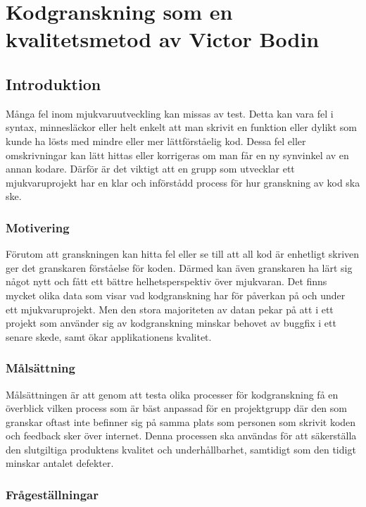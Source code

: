 \chapter{Kodgranskning som en kvalitetsmetod av Victor Bodin}
\section{Introduktion}
\label{sec:victor-introduction}
Många fel inom mjukvaruutveckling kan missas av test. Detta kan vara fel i syntax, minnesläckor eller helt enkelt att man skrivit en funktion eller dylikt som kunde ha lösts med mindre eller mer lättförståelig kod. Dessa fel eller omskrivningar kan lätt hittas eller korrigeras om man får en ny synvinkel av en annan kodare. Därför är det viktigt att en grupp som utvecklar ett mjukvaruprojekt har en klar och införstådd process för hur granskning av kod ska ske.

\subsection{Motivering}
\label{sec:victor-motivation}

Förutom att granskningen kan hitta fel eller se till att all kod är enhetligt skriven ger det granskaren förståelse för koden. Därmed kan även granskaren ha lärt sig något nytt och fått ett bättre helhetsperspektiv över mjukvaran. Det finns mycket olika data som visar vad kodgranskning har för påverkan på och under ett mjukvaruprojekt. Men den stora majoriteten av datan pekar på att i ett projekt som använder sig av kodgranskning minskar behovet av buggfix i ett senare skede, samt ökar applikationens kvalitet.\cite{review_expectations}\cite{review_foureyes}

\subsection{Målsättning}
\label{sec:victor-aim}

Målsättningen är att genom att testa olika processer för kodgranskning få en överblick vilken process som är bäst anpassad för en projektgrupp där den som granskar oftast inte befinner sig på samma plats som personen som skrivit koden och feedback sker över internet. Denna processen ska användas för att säkerställa den slutgiltiga produktens kvalitet och underhållbarhet, samtidigt som den tidigt minskar antalet defekter.  

\subsection{Frågeställningar}
\label{sec:victor-research-questions}

